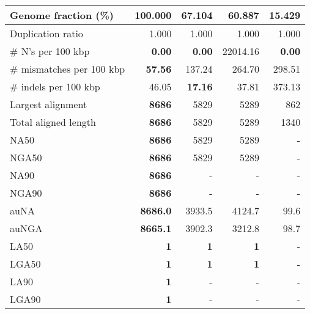 \documentclass[12pt,a4paper]{article}
\begin{document}
\begin{table}[ht]
\begin{center}
\begin{tabular}{|l*{4}{|r}|}
Genome fraction (\%) & {\bf 100.000} & 67.104 & 60.887 & 15.429 \\ \hline
Duplication ratio & 1.000 & 1.000 & 1.000 & 1.000 \\ \hline
\# N's per 100 kbp & {\bf 0.00} & {\bf 0.00} & 22014.16 & {\bf 0.00} \\ \hline
\# mismatches per 100 kbp & {\bf 57.56} & 137.24 & 264.70 & 298.51 \\ \hline
\# indels per 100 kbp & 46.05 & {\bf 17.16} & 37.81 & 373.13 \\ \hline
Largest alignment & {\bf 8686} & 5829 & 5289 & 862 \\ \hline
Total aligned length & {\bf 8686} & 5829 & 5289 & 1340 \\ \hline
NA50 & {\bf 8686} & 5829 & 5289 & - \\ \hline
NGA50 & {\bf 8686} & 5829 & 5289 & - \\ \hline
NA90 & {\bf 8686} & - & - & - \\ \hline
NGA90 & {\bf 8686} & - & - & - \\ \hline
auNA & {\bf 8686.0} & 3933.5 & 4124.7 & 99.6 \\ \hline
auNGA & {\bf 8665.1} & 3902.3 & 3212.8 & 98.7 \\ \hline
LA50 & {\bf 1} & {\bf 1} & {\bf 1} & - \\ \hline
LGA50 & {\bf 1} & {\bf 1} & {\bf 1} & - \\ \hline
LA90 & {\bf 1} & - & - & - \\ \hline
LGA90 & {\bf 1} & - & - & - \\ \hline
\end{tabular}
\end{center}
\end{table}
\end{document}
